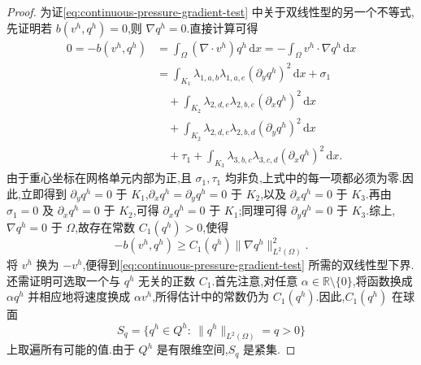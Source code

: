 \begin{proof}
为证\cref{eq:continuous-pressure-gradient-test} 中关于双线性型的另一个不等式,先证明若 $b(v^h,q^h)=0$,则 $\nabla q^h=0$.直接计算可得
\begin{equation}\label{eq:taylor-hood-k2-kernel-identity}
\begin{aligned}
  0=-b(v^h,q^h)
  &=\int_\Omega(\nabla\cdot v^h)q^h\,\mathrm{d}x
   =-\int_\Omega v^h\cdot\nabla q^h\,\mathrm{d}x\\
  &=\int_{K_1}\lambda_{1,a,b}\lambda_{1,a,e}(\partial_yq^h)^2\,\mathrm{d}x+\sigma_1\\
  &\quad+\int_{K_2}\lambda_{2,d,e}\lambda_{2,b,e}(\partial_xq^h)^2\,\mathrm{d}x\\
  &\quad+\int_{K_2}\lambda_{2,d,e}\lambda_{2,b,d}(\partial_yq^h)^2\,\mathrm{d}x\\
  &\quad+\tau_1+\int_{K_3}\lambda_{3,b,c}\lambda_{3,c,d}(\partial_xq^h)^2\,\mathrm{d}x.
\end{aligned}
\end{equation}
由于重心坐标在网格单元内部为正,且 $\sigma_1,\tau_1$ 均非负,上式中的每一项都必须为零.因此,立即得到 $\partial_yq^h=0$ 于 $K_1$,$\partial_xq^h=\partial_yq^h=0$ 于 $K_2$,以及 $\partial_xq^h=0$ 于 $K_3$.再由 $\sigma_1=0$ 及 $\partial_xq^h=0$ 于 $K_2$,可得 $\partial_xq^h=0$ 于 $K_1$;同理可得 $\partial_yq^h=0$ 于 $K_3$.综上,$\nabla q^h=0$ 于 $\Omega$,故存在常数 $C_1(q^h)>0$,使得
\[
  -b(v^h,q^h)\ge C_1(q^h)\|\nabla q^h\|_{L^2(\Omega)}^2.
\]
将 $v^h$ 换为 $-v^h$,便得到\cref{eq:continuous-pressure-gradient-test} 所需的双线性型下界.
还需证明可选取一个与 $q^h$ 无关的正数 $C_1$.首先注意,对任意 $\alpha\in\mathbb{R}\setminus\{0\}$,将函数换成 $\alpha q^h$ 并相应地将速度换成 $\alpha v^h$,所得估计中的常数仍为 $C_1(q^h)$.因此,$C_1(q^h)$ 在球面
\[
  S_q=\{q^h\in Q^h:\ \|q^h\|_{L^2(\Omega)}=q>0\}
\]
上取遍所有可能的值.由于 $Q^h$ 是有限维空间,$S_q$ 是紧集.


\end{proof}
